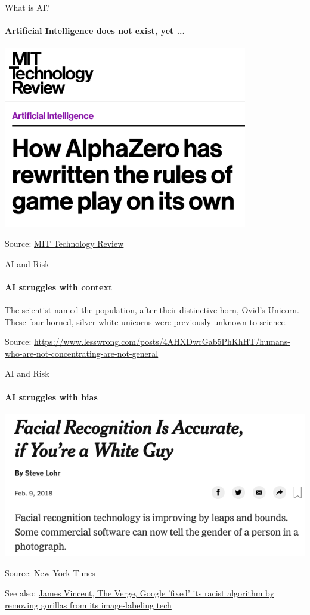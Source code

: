 \begin{frame}{What is AI?}
  \framesubtitle{Artificial Intelligence does not exist, yet ...}
  \includegraphics[width=0.8\textwidth]{graphics/alpha_go}

  Source: \href{https://www.technologyreview.com/s/612923/how-alphazero-has-rewritten-the-rules-of-gameplay-on-its-own/}{MIT Technology Review}
\end{frame}

\begin{frame}{AI and Risk}
  \framesubtitle{AI struggles with context}
  The scientist named the population, after their distinctive horn, Ovid's Unicorn. These four-horned, silver-white unicorns were previously unknown to science.\newline

  Source: \href{https://www.lesswrong.com/posts/4AHXDwcGab5PhKhHT/humans-who-are-not-concentrating-are-not-general}{https://www.lesswrong.com/posts/4AHXDwcGab5PhKhHT/humans-who-are-not-concentrating-are-not-general}
\end{frame}

\begin{frame}{AI and Risk}
  \framesubtitle{AI struggles with bias}
  \includegraphics[height=0.6\textheight]{graphics/facial_bias}

  Source: \href{https://www.nytimes.com/2018/02/09/technology/facial-recognition-race-artificial-intelligence.html}{New York Times}

  See also: \href{https://www.theverge.com/2018/1/12/16882408/google-racist-gorillas-photo-recognition-algorithm-ai}{James Vincent, The Verge, Google 'fixed' its racist algorithm by removing gorillas from its image-labeling tech}
\end{frame}

